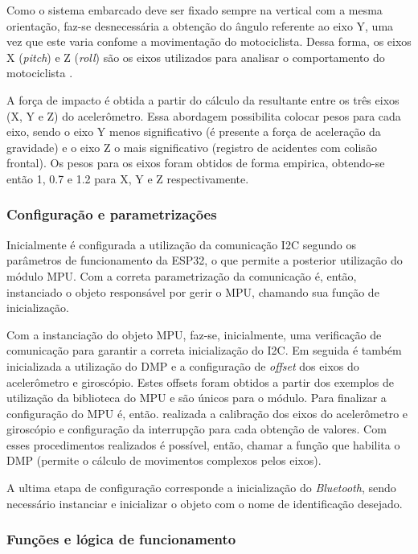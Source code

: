 Como o sistema embarcado deve ser fixado sempre na vertical com a mesma orientação, faz-se desnecessária a obtenção do ângulo referente ao eixo Y, uma vez que este varia confome a movimentação do motociclista. Dessa forma, os eixos X (\textit{pitch}) e Z (\textit{roll}) são os eixos utilizados para analisar o comportamento do motociclista .

A força de impacto é obtida a partir do cálculo da resultante entre os três eixos (X, Y e Z) do acelerômetro. Essa abordagem possibilita colocar pesos para cada eixo, sendo o eixo Y menos significativo (é presente a força de aceleração da gravidade) e o eixo Z o mais significativo (registro de acidentes com colisão frontal). Os pesos para os eixos foram obtidos de forma empirica, obtendo-se então 1, 0.7 e 1.2 para X, Y e Z respectivamente.


\subsubsection{Configuração e parametrizações}

Inicialmente é configurada a utilização da comunicação I2C segundo os parâmetros de funcionamento da ESP32, o que permite a posterior utilização do módulo MPU. Com a correta parametrização da comunicação é, então, instanciado o objeto responsável por gerir o MPU, chamando sua função de inicialização.

Com a instanciação do objeto MPU, faz-se, inicialmente, uma verificação de comunicação para garantir a correta inicialização do I2C. Em seguida é também inicializada a utilização do DMP e a configuração de \textit{offset} dos eixos do acelerômetro e giroscópio. Estes offsets foram obtidos a partir dos exemplos de utilização da biblioteca do MPU e são únicos para o módulo. Para finalizar a configuração do MPU é, então. realizada a calibração dos eixos do acelerômetro e giroscópio e configuração da interrupção para cada obtenção de valores. Com esses procedimentos realizados é possível, então, chamar a função que habilita o DMP (permite o cálculo de movimentos complexos pelos eixos).

A ultima etapa de configuração corresponde a inicialização do \textit{Bluetooth}, sendo necessário instanciar e inicializar o objeto com o nome de identificação desejado.



\subsubsection{Funções e lógica de funcionamento}


